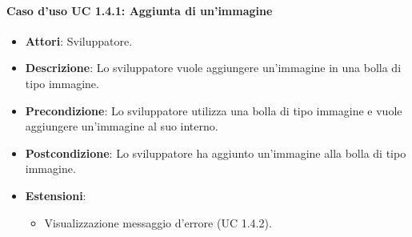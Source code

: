 \paragraph{Caso d'uso UC 1.4.1: Aggiunta di un'immagine}

\FloatBarrier
\begin{itemize}
\item\textbf{Attori}: Sviluppatore.
\item\textbf{Descrizione}: Lo sviluppatore vuole aggiungere un'immagine in una bolla di tipo immagine.
\item\textbf{Precondizione}: Lo sviluppatore utilizza una bolla di tipo immagine e vuole aggiungere un'immagine al suo interno.
\item\textbf{Postcondizione}: Lo sviluppatore ha aggiunto un'immagine alla bolla di tipo immagine.
\item \textbf{Estensioni}: 
\begin{itemize}
\item Visualizzazione messaggio d'errore (UC 1.4.2).
\end{itemize}
\end{itemize}

